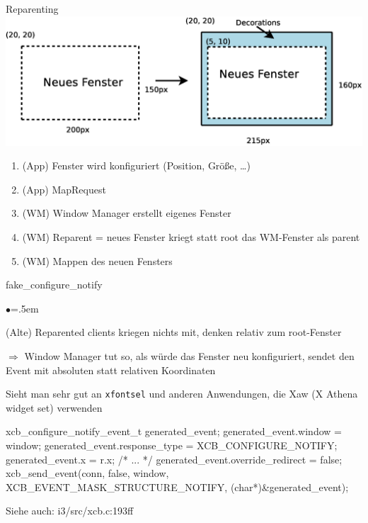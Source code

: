\documentclass[mode=print,paper=screen,style=jefka]{powerdot}
\newcommand{\isrc}[1]{\begin{center} \footnotesize\ttfamily Siehe auch: #1 \end{center}}
\begin{document}
\begin{slide}[method=direct]{Reparenting}
\includegraphics[width=1\textwidth]{reparenting.eps}
\begin{enumerate}
	\item (App) Fenster wird konfiguriert (Position, Größe, …)
	\item (App) MapRequest
	\item (WM) Window Manager erstellt eigenes Fenster
	\item (WM) Reparent = neues Fenster kriegt statt root das WM-Fenster als parent
	\item (WM) Mappen des neuen Fensters
\end{enumerate}
\end{slide}

\begin{slide}[method=direct]{fake\_configure\_notify}
\begin{list}{$\bullet$}{\itemsep=.5em}
	\item (Alte) Reparented clients kriegen nichts mit, denken relativ zum root-Fenster
	\item $\Rightarrow$ Window Manager tut so, als würde das Fenster neu konfiguriert, sendet den Event mit absoluten statt relativen Koordinaten
	\item Sieht man sehr gut an \texttt{xfontsel} und anderen Anwendungen, die Xaw (X Athena widget set) verwenden
\end{list}
\begin{code}
        xcb_configure_notify_event_t generated_event;
        generated_event.window = window;
        generated_event.response_type = XCB_CONFIGURE_NOTIFY;
        generated_event.x = r.x;
	/* ... */
        generated_event.override_redirect = false;
        xcb_send_event(conn, false, window,
		       XCB_EVENT_MASK_STRUCTURE_NOTIFY,
		       (char*)&generated_event);
\end{code}
\isrc{i3/src/xcb.c:193ff}
\end{slide}
\end{document}
